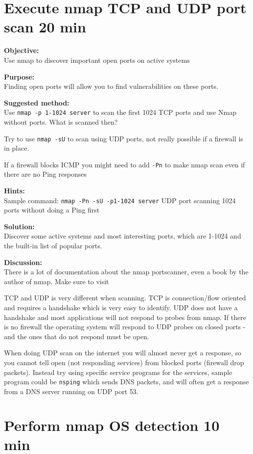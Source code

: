 \documentclass[a4paper,11pt,notitlepage]{report}
\begin{document}
\chapter{Execute nmap TCP and UDP port scan 20 min}
\label{ex:nmap-synscan}


{\bf Objective:} \\
Use nmap to discover important open ports on active systems

{\bf Purpose:}\\
Finding open ports will allow you to find vulnerabilities on these ports.

{\bf Suggested method:}\\
Use \verb+nmap -p 1-1024 server+ to scan the first 1024 TCP
ports and use Nmap without ports. What is scanned then?

Try to use \verb+nmap -sU+ to scan using UDP ports, not really possible if a firewall is in place.

If a firewall blocks ICMP you might need to add \verb+-Pn+ to make nmap scan even if there are no Ping responses

{\bf Hints:} \\
Sample command: \verb+nmap -Pn -sU -p1-1024 server+ UDP port scanning
1024 ports without doing a Ping first

{\bf Solution:}\\
Discover some active systems and most interesting ports, which are 1-1024 and the built-in list of popular ports.

{\bf Discussion:}\\
There is a lot of documentation about the nmap portscanner, even a book by the author
of nmap. Make sure to visit 

TCP and UDP is very different when scanning. TCP is connection/flow oriented and requires a handshake which is very easy to identify. UDP does not have a handshake and most applications will not respond to probes from nmap. If there is no firewall the operating system will respond to UDP probes on closed ports - and the ones that do not respond must be open.

When doing UDP scan on the internet you will almost never get a response, so you cannot tell open (not responding services) from blocked ports (firewall drop packets). Instead try using specific service programs for the services, sample program could be \verb+nsping+ which sends DNS packets, and will often get a response from a DNS server running on UDP port 53.

\chapter{Perform nmap OS detection 10 min}
\label{ex:nmap-os}
\end{document}
